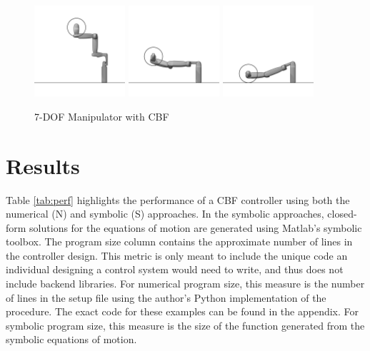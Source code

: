 \begin{figure}[H]
    \centering
    \includegraphics[width=0.3\textwidth]{Figures/Examples/7DOF/Frame0.png}
    \includegraphics[width=0.3\textwidth]{Figures/Examples/7DOF/Frame56CBF.png}
    \includegraphics[width=0.3\textwidth]{Figures/Examples/7DOF/Frame300CBF.png}
    \caption{7-DOF Manipulator with CBF}
    \label{fig:7dofcbf2}
\end{figure}

\section{Results}
Table \ref{tab:perf} highlights the performance of a CBF controller using both the numerical (N) and symbolic (S) approaches. In the symbolic approaches, closed-form solutions for the equations of motion are generated using Matlab's symbolic toolbox. The program size column contains the approximate number of lines in the controller design. This metric is only meant to include the unique code an individual designing a control system would need to write, and thus does not include backend libraries. For numerical program size, this measure is the number of lines in the setup file using the author's Python implementation of the \algname{} procedure. The exact code for these examples can be found in the appendix. For symbolic program size, this measure is the size of the function generated from the symbolic equations of motion.

